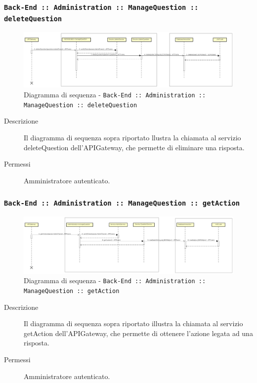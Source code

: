 \documentclass[../DefinizioneDiProdotto.tex]{subfiles}
\begin{document}
		\newpage
		\subsubsection{\texttt{Back-End :: Administration :: ManageQuestion :: deleteQuestion}}
		\begin{figure}[!h]
			\centering
			\includegraphics[width=\textwidth]{DiagrammiSequenza/Back-End/manageQuestion/deleteQuestion.png}
			\caption{Diagramma di sequenza - \texttt{Back-End :: Administration :: ManageQuestion :: deleteQuestion }}
		\end{figure}
		\begin{description}
			\item [Descrizione] Il diagramma di sequenza sopra riportato  llustra la chiamata al servizio deleteQuestion dell'APIGateway, che permette di eliminare una risposta.
			\item [Permessi] Amministratore autenticato.
		\end{description}

		\subsubsection{\texttt{Back-End :: Administration :: ManageQuestion :: getAction}}
		\begin{figure}[!h]
			\centering
			\includegraphics[width=\textwidth]{DiagrammiSequenza/Back-End/manageQuestion/getAction.png}
			\caption{Diagramma di sequenza - \texttt{Back-End :: Administration :: ManageQuestion :: getAction} }
		\end{figure}
		\begin{description}
			\item [Descrizione] Il diagramma di sequenza sopra riportato illustra la chiamata al servizio getAction dell'APIGateway, che permette di ottenere l'azione legata ad una risposta.
			\item [Permessi] Amministratore autenticato.
		\end{description}
\end{document}
